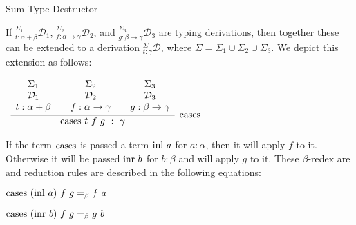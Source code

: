 \documentclass{book}
\begin{document}
    \begin{definition}{Sum Type Destructor}

        If $^{\Sigma_{1}}_{t : \alpha + \beta}\mathcal{D}_{1}$, $^{\Sigma_{2}}_{f : \alpha\rightarrow\gamma}\mathcal{D}_{2}$, and $^{\Sigma_{3}}_{g : \beta\rightarrow\gamma}\mathcal{D}_{3}$ are typing derivations, then together these can be extended to a derivation $^{\Sigma}_{t : \gamma}\mathcal{D}$, where $\Sigma = \Sigma_{1} \cup \Sigma_{2} \cup \Sigma_{3}$. We depict this extension as follows: 

        \begin{center}
            $\begin{array}{ c }
	
                \infer[\sumElim]{\sumElim \ t \ f \ g \ : \ \gamma}
                    {
                    \begin{array}{c} \Sigma_{1}  \\ \mathcal{D}_{1} \\ t : \alpha + \beta \end{array}
                     & 
                    \begin{array}{c} \Sigma_{2}  \\ \mathcal{D}_{2} \\ f : \alpha\rightarrow\gamma \end{array}				
                     & 
                    \begin{array}{c} \Sigma_{3}  \\ \mathcal{D}_{3} \\ g : \beta\rightarrow\gamma \end{array}				 
                    }	
            
            \end{array}$            
        \end{center}
    \end{definition}
    
    If the term $\text{cases}$ is passed a term $\text{inl} \ a$ for $a : \alpha$, then it will apply $f$ to it. Otherwise it will be passed $\inr \ b$ for $b : \beta$ and will apply $g$ to it. These $\beta$-redex are and reduction rules are described in the following equations: 

    \begin{center}
      $\text{cases} \ (\text{inl} \ a) \ f \ g =_{\beta} f \ a$ 
  
      $\text{cases} \ (\text{inr} \ b) \ f \ g =_{\beta} g \ b$
    \end{center}
\end{document}
